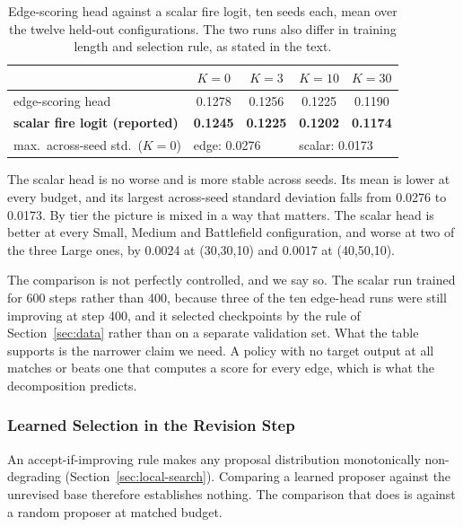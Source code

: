 \begin{table}[t]
\centering
\small
\caption{Edge-scoring head against a scalar fire logit, ten seeds each, mean
over the twelve held-out configurations. The two runs also differ in training
length and selection rule, as stated in the text.}
\label{tab:firelogit-ablation}
\begin{tabular}{@{}lcccc@{}}
\toprule
& $K{=}0$ & $K{=}3$ & $K{=}10$ & $K{=}30$ \\
\midrule
edge-scoring head & 0.1278 & 0.1256 & 0.1225 & 0.1190 \\
\textbf{scalar fire logit (reported)} & \textbf{0.1245} & \textbf{0.1225} & \textbf{0.1202} & \textbf{0.1174} \\
\midrule
max.\ across-seed std.\ ($K{=}0$) & \multicolumn{2}{l}{edge: 0.0276} & \multicolumn{2}{l}{scalar: 0.0173} \\
\bottomrule
\end{tabular}
\end{table}

The scalar head is no worse and is more stable across seeds. Its mean is lower
at every budget, and its largest across-seed standard deviation falls from
0.0276 to 0.0173. By tier the picture is mixed in a way that matters. The
scalar head is better at every Small, Medium and Battlefield configuration,
and worse at two of the three Large ones, by 0.0024 at (30,30,10) and 0.0017
at (40,50,10).

The comparison is not perfectly controlled, and we say so. The scalar run
trained for 600 steps rather than 400, because three of the ten edge-head runs
were still improving at step 400, and it selected checkpoints by the rule of
Section~\ref{sec:data} rather than on a separate validation set. What the
table supports is the narrower claim we need. A policy with no target output
at all matches or beats one that computes a score for every edge, which is
what the decomposition predicts.

\subsubsection{Learned Selection in the Revision Step}
\label{sec:learned-vs-random}

An accept-if-improving rule makes any proposal distribution monotonically
non-degrading (Section~\ref{sec:local-search}). Comparing a learned
proposer against the unrevised base therefore establishes nothing. The
comparison that does is against a random proposer at matched budget.

